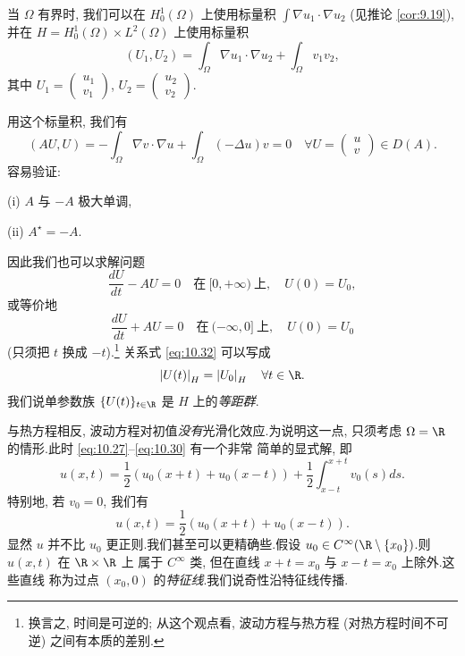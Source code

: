 \begin{remark}
\label{rem:10.7}
当 $\Omega$ 有界时, 我们可以在 $H_0^1(\Omega)$ 上使用标量积
$\int\nabla u_1\cdot\nabla u_2$ (见推论  \ref{cor:9.19}), 并在
$H=H_0^1(\Omega)\times L^2(\Omega)$ 上使用标量积
\begin{equation*}
(U_1,U_2)=\int_\Omega\nabla u_1\cdot\nabla u_2+\int_\Omega v_1v_2,
\end{equation*}
其中 $U_1=\begin{pmatrix}u_1\\v_1\end{pmatrix}$,
$U_2=\begin{pmatrix}u_2\\v_2\end{pmatrix}$.

用这个标量积, 我们有
\begin{equation*}
(AU,U)=-\int_\Omega\nabla v\cdot\nabla u+\int_\Omega(-\Delta u)v=0
\quad\forall U=\begin{pmatrix}u\\v\end{pmatrix}\in D(A).
\end{equation*}
容易验证:

(i) $A$ 与 $-A$ 极大单调,

(ii) $A^\star=-A$.
\end{remark}

因此我们也可以求解问题
\begin{equation*}
\frac{dU}{dt}-AU=0\quad\text{在}\ [0,+\infty)\ \text{上},\quad U(0)=U_0,
\end{equation*}
或等价地
\begin{equation*}
\frac{dU}{dt}+AU=0\quad\text{在}\ (-\infty,0]\ \text{上},\quad U(0)=U_0
\end{equation*}
(只须把 $t$ 换成 $-t$).\footnote{换言之, 时间是可逆的; 从这个观点看,
波动方程与热方程 (对热方程时间不可逆) 之间有本质的差别.} 关系式
\eqref{eq:10.32} 可以写成
\begin{equation*}
\abs{U(t)}_H=\abs{U_0}_H\quad\forall t\in\R.
\end{equation*}
我们说单参数族 $\{U(t)\}_{t\in\R}$ 是 $H$ 上的\emph{等距群}.

\begin{keyremark}
\label{rem:10.8}
与热方程相反, 波动方程对初值\emph{没有}光滑化效应.为说明这一点, 只须考虑
$\Omega=\R$ 的情形.此时 \eqref{eq:10.27}--\eqref{eq:10.30} 有一个非常
简单的显式解, 即
\begin{equation}
u(x,t)=\frac12(u_0(x+t)+u_0(x-t))
+\frac12\int_{x-t}^{x+t}v_0(s)ds.
\label{eq:10.40}
\end{equation}
特别地, 若 $v_0=0$, 我们有
\begin{equation*}
u(x,t)=\frac12(u_0(x+t)+u_0(x-t)).
\end{equation*}
显然 $u$ 并不比 $u_0$ 更正则.我们甚至可以更精确些.假设
$u_0\in C^\infty(\R\setminus\{x_0\})$.则 $u(x,t)$ 在 $\R\times\R$ 上
属于 $C^\infty$ 类, 但在直线 $x+t=x_0$ 与 $x-t=x_0$ 上除外.这些直线
称为过点 $(x_0,0)$ 的\emph{特征线}.我们说奇性沿特征线传播.
\end{keyremark}

